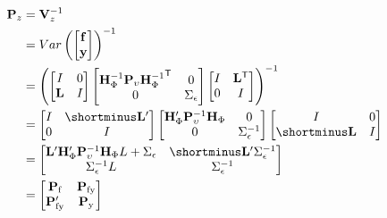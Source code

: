 \documentclass[notitlepage,a4paper,12pt]{article}
\newcommand{\transpose}[1]{{#1}^{\sf{T}}}
\begin{document}
\begin{align*}
    \mathbf{P}_z 
    &= 
    \mathbf{V}^{-1}_z \\
    &= 
    Var\left(
    \begin{bmatrix}
        \mathbf{f} \\
        \mathbf{y}
    \end{bmatrix}
    \right)^{-1} \\
    &=  
    \left(
    \begin{bmatrix}
        I & 0 \\
        \mathbf{L} & I
    \end{bmatrix}
    \begin{bmatrix}
        \mathbf{H}^{-1}_{\Phi} \mathbf{P}_{\upsilon} \transpose{\mathbf{H}^{-1}_{\Phi}} & 0 \\
        0 & \Sigma_{\epsilon}
    \end{bmatrix} 
    \begin{bmatrix}
        I & \mathbf{L}^{\sf{T}} \\
        0 & I
    \end{bmatrix}
    \right)^{-1}\\
    &=
    \begin{bmatrix}
        I & \shortminus\mathbf{L}' \\
        0 & I
    \end{bmatrix}
    \begin{bmatrix}
        \mathbf{H}'_{\Phi} \mathbf{P}^{-1}_{\upsilon} \mathbf{H}_{\Phi} & 0 \\
        0 & \Sigma^{-1}_{\epsilon}
    \end{bmatrix} 
    \begin{bmatrix}
        I & 0 \\
        \shortminus\mathbf{L} & I 
    \end{bmatrix} \\
    &=
    \begin{bmatrix}
        \mathbf{L}' \mathbf{H}'_{\Phi} \mathbf{P}^{-1}_{\upsilon} \mathbf{H}_{\Phi} L + \Sigma_{\epsilon} & \shortminus \mathbf{L}' \Sigma^{-1}_{\epsilon} \\
        \Sigma^{-1}_{\epsilon} L & \Sigma^{-1}_{\epsilon}
    \end{bmatrix} \\
    &= 
    \begin{bmatrix}
        \mathbf{P}_{\text{f}} & \mathbf{P}_{\text{fy}} \\
        \mathbf{P}'_{\text{fy}} & \mathbf{P}_{\text{y}}  
    \end{bmatrix}
\end{align*}
\end{document}
